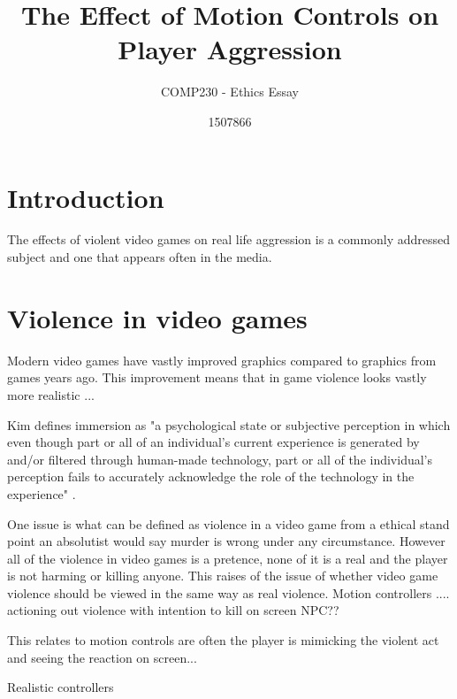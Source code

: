 \documentclass{scrartcl}
\title{The Effect of Motion Controls on Player Aggression }
\subtitle{COMP230 - Ethics Essay}
\author{1507866}
\begin{document}
	
\maketitle
	
	
\section{Introduction}
The effects of violent video games on real life aggression is a commonly addressed subject and one that appears often in the media. 

\section{Violence in video games}
 
Modern video games have vastly improved graphics compared to graphics from games years ago. \cite{Caranagey} This improvement means that in game violence looks vastly more realistic ...

Kim defines immersion as "a psychological state or  subjective  perception  in which  even   though   part   or   all   of   an   individual’s   current   experience  is  generated  by  and/or  filtered  through  human-made  technology,  part  or  all  of  the  individual’s  perception  fails  to  accurately   acknowledge   the   role   of   the   technology   in   the   experience" \cite{Kim}.


One issue is what can be defined as violence in a video game from a ethical stand point an absolutist would say murder is wrong under any circumstance. \cite{forsyth1980taxonomy} However all of the violence in video games is a pretence, none of it is a real and the player is not harming or killing anyone. \cite{Tavinor} This raises of the issue of whether video game violence should be viewed in the same way as real violence. Motion controllers .... actioning out violence with intention to kill on screen NPC??

This relates to motion controls are often the player is mimicking the violent act and seeing the reaction on screen...


Realistic controllers \cite{McGloin}
\end{document}
